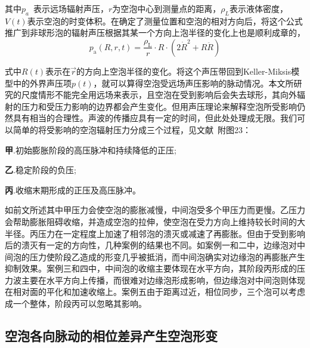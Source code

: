 其中$p_a$~表示远场辐射声压，$r$为空泡中心到测量点的距离，$\rho_L$表示液体密度，$V(t)$表示空泡的时变体积\cite{brennen_cavitation_2003}。在确定了测量位置和空泡的相对方向后，将这个公式推广到非球形泡的辐射声压根据其某一个方向上泡半径的变化上也是顺利成章的\cite{zhang_secondary_2016}，
\[p_{\text{a}}(R,r,t)=\frac{\rho_{\text{L}}}{r}\cdot R\cdot (2\dot R^{2}+R\ddot R)\]

式中$R(t)$表示在$\vec r$的方向上空泡半径的变化。将这个声压带回到Keller-Miksis模型中的外界声压项$p(t)$，就可以算得空泡受远场声压影响的脉动情况。本文所研究的尺度情形不能完全用远场来表示，且空泡在受到影响后会失去球形，其向外辐射的压力和受压力影响的边界都会产生变化。但用声压理论来解释空泡所受影响仍然具有相当的合理性\cite{bremond_interaction_2006}。声波的传播应具有一定的时间，但此处处理成无限。我们可以简单的将受影响的空泡辐射压力分成三个过程，见文献\cite{lv_experimental_2019}~附图23：

\textbf{甲}.初始膨胀阶段的高压脉冲和持续降低的正压;

\textbf{乙}.稳定阶段的负压;

\textbf{丙}.收缩末期形成的正压及高压脉冲。

如前文所述其中甲压力会使空泡的膨胀减慢，中间泡受多个甲压力而更慢。乙压力会帮助膨胀阻碍收缩，并造成空泡的拉伸，使空泡在受力方向上维持较长时间的大半径。丙压力在一定程度上加速了相邻泡的溃灭或减速了再膨胀。但由于受到影响后的溃灭有一定的方向性，几种案例的结果也不同。如案例一和二中，边缘泡对中间泡的压力使阶段乙造成的形变几乎被抵消，而中间泡确实对边缘泡的再膨胀产生抑制效果。案例三和四中，中间泡的收缩主要体现在水平方向，其阶段丙形成的压力波主要在水平方向上传播，而很难对边缘泡形成影响，但边缘泡对中间泡则体现在相对面的平化和加速收缩上。案例五由于距离过近，相位同步，三个泡可以考虑成一个整体，阶段丙可以忽略其影响。


\subsection{空泡各向脉动的相位差异产生空泡形变}

